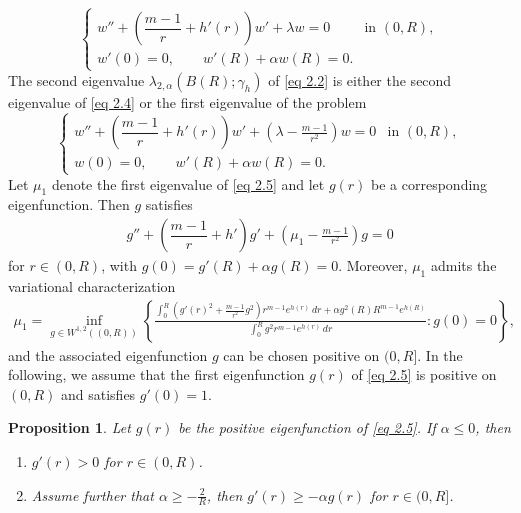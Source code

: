 \documentclass[11pt,leqno]{amsart}
\newtheorem{proposition}{Proposition}[section]
\def\a{\alpha}
\def\l{\lambda}
\numberwithin{equation}{section}
\begin{document}
\begin{equation} \label{eq 2.4}
\begin{cases}
w'' + \left( \dfrac{m-1}{r} + h'(r) \right)w' +\l w=0 & \text{in } (0,R), \\
w'(0) =0, \qquad  w'(R)+\alpha w(R) = 0.
\end{cases}
\end{equation}
The second eigenvalue $\l_{2, \a}(B(R);\gamma_h)$ of \eqref{eq 2.2} is  either the second eigenvalue of \eqref{eq 2.4} or the first eigenvalue of the problem
\begin{equation} \label{eq 2.5}
\begin{cases}
w'' + \left( \dfrac{m-1}{r} + h'(r) \right)w' + (\l-\frac {m-1} {r^2}) w = 0 & \text{in } (0,R), \\
w(0)=0, \qquad  w'(R)+\alpha w(R) = 0.
\end{cases}
\end{equation}
Let $\mu_1$ denote the first eigenvalue of \eqref{eq 2.5} and let
$g(r)$ be a corresponding eigenfunction. Then $g$ satisfies
\begin{align}\label{eq 2.7}
   g'' + \left( \dfrac{m-1}{r} + h' \right)g' + (\mu_1-\frac {m-1} {r^2}) g = 0 
\end{align}
for $r\in (0, R)$, with  $g(0)=g'(R)+\a g(R)=0$. Moreover, 
$\mu_1$ admits the variational characterization
\begin{align}\label{eq 2.8}
 \mu_1= \inf_{ g\in W^{1,2}((0,R))} \left\{
    \frac{\int_0^R\left( g'(r)^2+\frac{m-1}{r^2} g^2\right) r^{m-1}e^{h(r)} \, dr +\a  g^2(R)R^{m-1}e^{h(R)}}{\int_0^R g^2 r^{m-1}e^{h(r)}\,  dr}: g(0)=0\right\},
\end{align}
and the associated eigenfunction $g$ can be chosen positive on $(0, R]$. In the following, we assume that the first eigenfunction $g(r)$ of \eqref{eq 2.5}  is positive on $(0, R)$ and satisfies $g'(0)=1$.
\begin{proposition}\label{prop 2.2}
Let $g(r)$ be the  positive  eigenfunction of \eqref{eq 2.5}. If $\a\le 0$, then
\begin{enumerate}
\item $g'(r)>0$ for $r\in (0, R)$.
\item Assume further that $\a\ge -\frac 2 R$, then  $g'(r)\ge  -\a g(r)$ for $r\in (0, R]$.
\end{enumerate}
\end{proposition}
\end{document}
